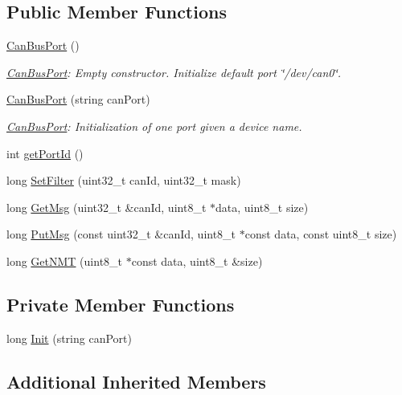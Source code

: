 \subsection*{Public Member Functions}
\begin{DoxyCompactItemize}
\item 
\hyperlink{classCanBusPort_a4ccb8d39da6185bfe5c1dee38db51987}{Can\+Bus\+Port} ()
\begin{DoxyCompactList}\small\item\em \hyperlink{classCanBusPort}{Can\+Bus\+Port}\+: Empty constructor. Initialize default port \char`\"{}/dev/can0\char`\"{}. \end{DoxyCompactList}\item 
\hyperlink{classCanBusPort_ad4649a2da594bbffc267483646fb1405}{Can\+Bus\+Port} (string can\+Port)
\begin{DoxyCompactList}\small\item\em \hyperlink{classCanBusPort}{Can\+Bus\+Port}\+: Initialization of one port given a device name. \end{DoxyCompactList}\item 
int \hyperlink{classCanBusPort_a7c6b733c5834d4ab3e1906d847a2234a}{get\+Port\+Id} ()
\item 
long \hyperlink{classCanBusPort_af09c794e3af86e89c8a511535f856dc9}{Set\+Filter} (uint32\+\_\+t can\+Id, uint32\+\_\+t mask)
\item 
long \hyperlink{classCanBusPort_a13d6b06d93debc20b2f49aa8e7139988}{Get\+Msg} (uint32\+\_\+t \&can\+Id, uint8\+\_\+t $\ast$data, uint8\+\_\+t size)
\item 
long \hyperlink{classCanBusPort_a2bb802ad7a14e260f0f51b79d4c53c43}{Put\+Msg} (const uint32\+\_\+t \&can\+Id, uint8\+\_\+t $\ast$const data, const uint8\+\_\+t size)
\item 
long \hyperlink{classCanBusPort_a41242dc7980ca398e4770813e50ef32b}{Get\+N\+MT} (uint8\+\_\+t $\ast$const data, uint8\+\_\+t \&size)
\end{DoxyCompactItemize}
\subsection*{Private Member Functions}
\begin{DoxyCompactItemize}
\item 
long \hyperlink{classCanBusPort_a0de0778cfc475d2da559668be55f6015}{Init} (string can\+Port)
\end{DoxyCompactItemize}
\subsection*{Additional Inherited Members}


